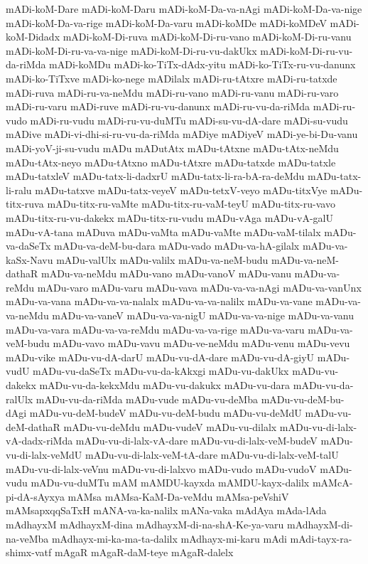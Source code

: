 {mADi-koM-Dare
mADi-koM-Daru
mADi-koM-Da-va-nAgi
mADi-koM-Da-va-nige
mADi-koM-Da-va-rige
mADi-koM-Da-varu
mADi-koMDe
mADi-koMDeV
mADi-koM-Didadx
mADi-koM-Di-ruva
mADi-koM-Di-ru-vano
mADi-koM-Di-ru-vanu
mADi-koM-Di-ru-va-va-nige
mADi-koM-Di-ru-vu-dakUkx
mADi-koM-Di-ru-vu-da-riMda
mADi-koMDu
mADi-ko-TiTx-dAdx-yitu
mADi-ko-TiTx-ru-vu-danunx
mADi-ko-TiTxve
mADi-ko-nege
mADilalx
mADi-ru-tAtxre
mADi-ru-tatxde
mADi-ruva
mADi-ru-va-neMdu
mADi-ru-vano
mADi-ru-vanu
mADi-ru-varo
mADi-ru-varu
mADi-ruve
mADi-ru-vu-danunx
mADi-ru-vu-da-riMda
mADi-ru-vudo
mADi-ru-vudu
mADi-ru-vu-duMTu
mADi-su-vu-dA-dare
mADi-su-vudu
mADive
mADi-vi-dhi-si-ru-vu-da-riMda
mADiye
mADiyeV
mADi-ye-bi-Du-vanu
mADi-yoV-ji-su-vudu
mADu
mADutAtx
mADu-tAtxne
mADu-tAtx-neMdu
mADu-tAtx-neyo
mADu-tAtxno
mADu-tAtxre
mADu-tatxde
mADu-tatxle
mADu-tatxleV
mADu-tatx-li-dadxrU
mADu-tatx-li-ra-bA-ra-deMdu
mADu-tatx-li-ralu
mADu-tatxve
mADu-tatx-veyeV
mADu-tetxV-veyo
mADu-titxVye
mADu-titx-ruva
mADu-titx-ru-vaMte
mADu-titx-ru-vaM-teyU
mADu-titx-ru-vavo
mADu-titx-ru-vu-dakekx
mADu-titx-ru-vudu
mADu-vAga
mADu-vA-galU
mADu-vA-tana
mADuva
mADu-vaMta
mADu-vaMte
mADu-vaM-tilalx
mADu-va-daSeTx
mADu-va-deM-bu-dara
mADu-vado
mADu-va-hA-gilalx
mADu-va-kaSx-Navu
mADu-valUlx
mADu-valilx
mADu-va-neM-budu
mADu-va-neM-dathaR
mADu-va-neMdu
mADu-vano
mADu-vanoV
mADu-vanu
mADu-va-reMdu
mADu-varo
mADu-varu
mADu-vava
mADu-va-va-nAgi
mADu-va-vanUnx
mADu-va-vana
mADu-va-va-nalalx
mADu-va-va-nalilx
mADu-va-vane
mADu-va-va-neMdu
mADu-va-vaneV
mADu-va-va-nigU
mADu-va-va-nige
mADu-va-vanu
mADu-va-vara
mADu-va-va-reMdu
mADu-va-va-rige
mADu-va-varu
mADu-va-veM-budu
mADu-vavo
mADu-vavu
mADu-ve-neMdu
mADu-venu
mADu-vevu
mADu-vike
mADu-vu-dA-darU
mADu-vu-dA-dare
mADu-vu-dA-giyU
mADu-vudU
mADu-vu-daSeTx
mADu-vu-da-kAkxgi
mADu-vu-dakUkx
mADu-vu-dakekx
mADu-vu-da-kekxMdu
mADu-vu-dakukx
mADu-vu-dara
mADu-vu-da-ralUlx
mADu-vu-da-riMda
mADu-vude
mADu-vu-deMba
mADu-vu-deM-bu-dAgi
mADu-vu-deM-budeV
mADu-vu-deM-budu
mADu-vu-deMdU
mADu-vu-deM-dathaR
mADu-vu-deMdu
mADu-vudeV
mADu-vu-dilalx
mADu-vu-di-lalx-vA-dadx-riMda
mADu-vu-di-lalx-vA-dare
mADu-vu-di-lalx-veM-budeV
mADu-vu-di-lalx-veMdU
mADu-vu-di-lalx-veM-tA-dare
mADu-vu-di-lalx-veM-talU
mADu-vu-di-lalx-veVnu
mADu-vu-di-lalxvo
mADu-vudo
mADu-vudoV
mADu-vudu
mADu-vu-duMTu
mAM
mAMDU-kayxda
mAMDU-kayx-dalilx
mAMcA-pi-dA-sAyxya
mAMsa
mAMsa-KaM-Da-veMdu
mAMsa-peVshiV
mAMsapxqqSaTxH
mANA-va-ka-nalilx
mANa-vaka
mAdAya
mAda-lAda
mAdhayxM
mAdhayxM-dina
mAdhayxM-di-na-shA-Ke-ya-varu
mAdhayxM-di-na-veMba
mAdhayx-mi-ka-ma-ta-dalilx
mAdhayx-mi-karu
mAdi
mAdi-tayx-ra-shimx-vatf
mAgaR
mAgaR-daM-teye
mAgaR-dalelx
}
